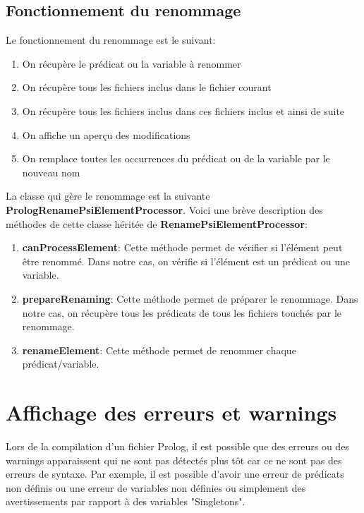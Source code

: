 \subsection{Fonctionnement du renommage}
\noindent Le fonctionnement du renommage est le suivant:
\begin{enumerate}
    \item On récupère le prédicat ou la variable à renommer
    \item On récupère tous les fichiers inclus dans le fichier courant
    \item On récupère tous les fichiers inclus dans ces fichiers inclus et ainsi de suite
    \item On affiche un aperçu des modifications
    \item On remplace toutes les occurrences du prédicat ou de la variable par le nouveau nom
\end{enumerate}

\noindent La classe qui gère le renommage est la suivante \textbf{PrologRenamePsiElementProcessor}.
Voici une brève description des méthodes de cette classe héritée de \textbf{RenamePsiElementProcessor}:
\begin{enumerate}
    \item \textbf{canProcessElement}: Cette méthode permet de vérifier si l'élément peut être renommé. Dans notre cas, on vérifie si l'élément est un prédicat ou une variable.
    \item \textbf{prepareRenaming}: Cette méthode permet de préparer le renommage. Dans notre cas, on récupère tous les prédicats de tous les fichiers touchés par le renommage.
    \item \textbf{renameElement}: Cette méthode permet de renommer chaque prédicat/variable.
\end{enumerate}


\section{Affichage des erreurs et warnings}
\noindent Lors de la compilation d'un fichier Prolog, il est possible que des erreurs ou des warnings apparaissent
qui ne sont pas détectés plus tôt car ce ne sont pas des erreurs de syntaxe.
\newdoubleline
Par exemple, il est possible d'avoir une erreur de prédicats non définis ou une erreur de variables non définies ou simplement des avertissements par rapport à des variables "Singletons".

